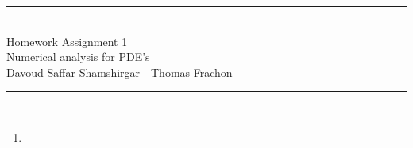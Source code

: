 \documentclass[10pt,a4paper,twoside, french]{article}
\numberwithin{equation}{section}
\numberwithin{figure}{section}
\numberwithin{table}{section}
\begin{document}
	\vspace{1cm}    
    \begin{center}
       		\rule{10cm}{1pt} \\[0.6cm]         %
        	{\huge Homework Assignment 1 \\[0.2cm]
         \Large  Numerical analysis for PDE's\\[0.2cm] 
          \large Davoud Saffar Shamshirgar - Thomas Frachon}  \\[0.6cm]
    		\rule{10cm}{1pt} \\[0.5cm]  
	\end{center}    
	
\setcounter{section}{1}
\begin{enumerate}
\item \begin{enumerate}[a.]

\end{enumerate}


\end{enumerate}	
	
	
	
	
\end{document}
